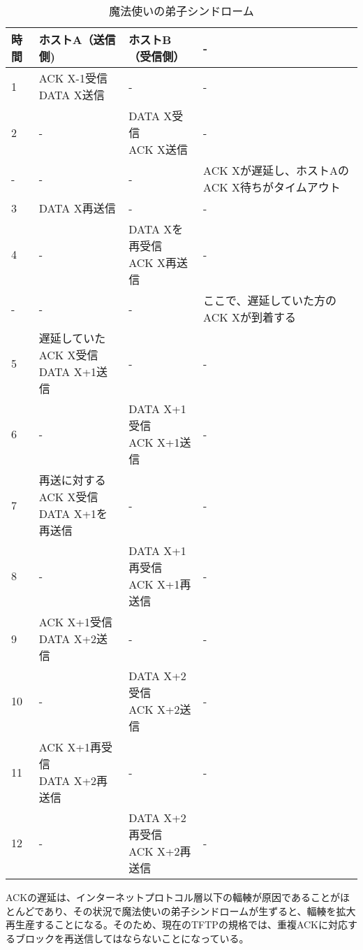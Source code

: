 \begin{table}[hbtp] \caption{魔法使いの弟子シンドローム} \label{rfc1123}
\begin{center}
{\footnotesize
	\begin{tabularx}{13cm}{lllX} \toprule
	時間 & ホストA（送信側) & ホストB（受信側） & - \\ \midrule
	1 & \shortstack{ ACK X-1受信 \\ DATA X送信} & - & - \\ \hline	
	2 & -  & \shortstack{ DATA X受信 \\ ACK X送信}  & - \\ \hline
	- & - & - & ACK Xが遅延し、ホストAのACK X待ちがタイムアウト\\ \hline
	3 & DATA X再送信 & - & - \\ \hline
	4 & - & \shortstack{DATA Xを再受信 \\ ACK X再送信} & - \\ \hline
	- & - & - & ここで、遅延していた方のACK Xが到着する \\ \hline
	5 & \shortstack{遅延していた ACK X受信 \\ DATA X+1送信} & - & - \\ \hline 	
	6 & - & \shortstack{ DATA X+1受信 \\ ACK X+1送信} & - \\ \hline
	7 & \shortstack{再送に対する ACK X受信 \\ DATA X+1を再送信} & - & - \\ \hline 	
	8 & - & \shortstack{DATA X+1再受信 \\ ACK X+1再送信} & - \\ \hline
	9  & \shortstack{ACK X+1受信 \\ DATA X+2送信} & - & - \\ \hline 	
	10 & - & \shortstack{DATA X+2受信 \\ ACK X+2送信} & - \\ \hline
	11 & \shortstack{ACK X+1再受信 \\ DATA X+2再送信} & - & - \\ \hline 	
	12 & - & \shortstack{DATA X+2再受信 \\ ACK X+2再送信} & - \\ \bottomrule
	\end{tabularx}
}
\end{center}
\end{table}


ACKの遅延は、インターネットプロトコル層以下の輻輳が原因であることがほとんどであり、その状況で魔法使いの弟子シンドロームが生ずると、輻輳を拡大再生産することになる。そのため、現在のTFTPの規格では、重複ACKに対応するブロックを再送信してはならないことになっている。